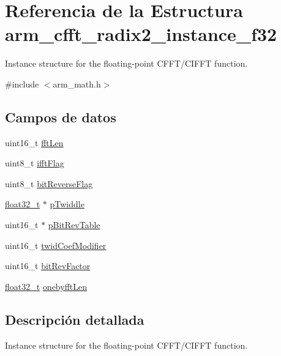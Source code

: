 \hypertarget{structarm__cfft__radix2__instance__f32}{}\section{Referencia de la Estructura arm\+\_\+cfft\+\_\+radix2\+\_\+instance\+\_\+f32}
\label{structarm__cfft__radix2__instance__f32}


Instance structure for the floating-\/point C\+F\+F\+T/\+C\+I\+F\+FT function.  




{\ttfamily \#include $<$arm\+\_\+math.\+h$>$}

\subsection*{Campos de datos}
\begin{DoxyCompactItemize}
\item 
uint16\+\_\+t \hyperlink{structarm__cfft__radix2__instance__f32_ab8db3bbe7c61e6bb8ca2a55e3446e11a}{fft\+Len}
\item 
uint8\+\_\+t \hyperlink{structarm__cfft__radix2__instance__f32_ad6ca6e223f986ebfd94c5ee1e410aa73}{ifft\+Flag}
\item 
uint8\+\_\+t \hyperlink{structarm__cfft__radix2__instance__f32_a09a221a818c6d0e064557a99e2fe9a8b}{bit\+Reverse\+Flag}
\item 
\hyperlink{arm__math_8h_a4611b605e45ab401f02cab15c5e38715}{float32\+\_\+t} $\ast$ \hyperlink{structarm__cfft__radix2__instance__f32_aca581481fccdff0f557f54a3ef20d967}{p\+Twiddle}
\item 
uint16\+\_\+t $\ast$ \hyperlink{structarm__cfft__radix2__instance__f32_a46a2fb328199897af100fea0bfdf59aa}{p\+Bit\+Rev\+Table}
\item 
uint16\+\_\+t \hyperlink{structarm__cfft__radix2__instance__f32_afe772e5b5001c9d8e85032115a8df5bf}{twid\+Coef\+Modifier}
\item 
uint16\+\_\+t \hyperlink{structarm__cfft__radix2__instance__f32_a33386d95319dc3ee7097b3a8e52e01ec}{bit\+Rev\+Factor}
\item 
\hyperlink{arm__math_8h_a4611b605e45ab401f02cab15c5e38715}{float32\+\_\+t} \hyperlink{structarm__cfft__radix2__instance__f32_acf295a7b97b7d48a9cae4d1ab5ed00f6}{onebyfft\+Len}
\end{DoxyCompactItemize}


\subsection{Descripción detallada}
Instance structure for the floating-\/point C\+F\+F\+T/\+C\+I\+F\+FT function. 

